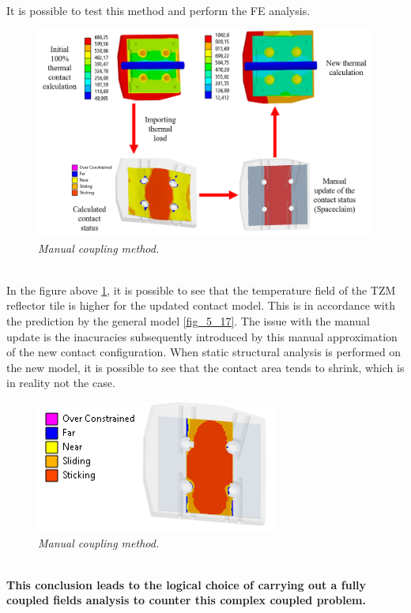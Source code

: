 \\
\normalsize{\indent It is possible to test this method and perform the \acrshort{FE} analysis.}
\\
\begin{figure}[!ht]
    \label{fig_5_18}
    \centering
    \includegraphics[width=1\textwidth]{figures/manualUpdate.png}
    \caption{\it Manual coupling method.}
\end{figure}
\\
\normalsize{\indent In the figure above \ref{fig_5_18}, it is possible to see that the temperature field of the \acrshort{TZM} reflector tile is higher for the updated contact model. This is in accordance with the prediction by the general model \ref{fig_5_17}. The issue with the manual update is the inacuracies subsequently introduced by this manual approximation of the new contact configuration. When static structural analysis is performed on the new model, it is possible to see that the contact area tends to shrink, which is in reality not the case.}
\\
\begin{figure}[!ht]
    \label{fig_5_20}
    \centering
    \includegraphics[width=.5\textwidth]{figures/contactShrink.png}
    \caption{\it Manual coupling method.}
\end{figure}
\\
\normalsize{\indent \bfseries This conclusion leads to the logical choice of carrying out a fully coupled fields analysis to counter this complex coupled problem.}